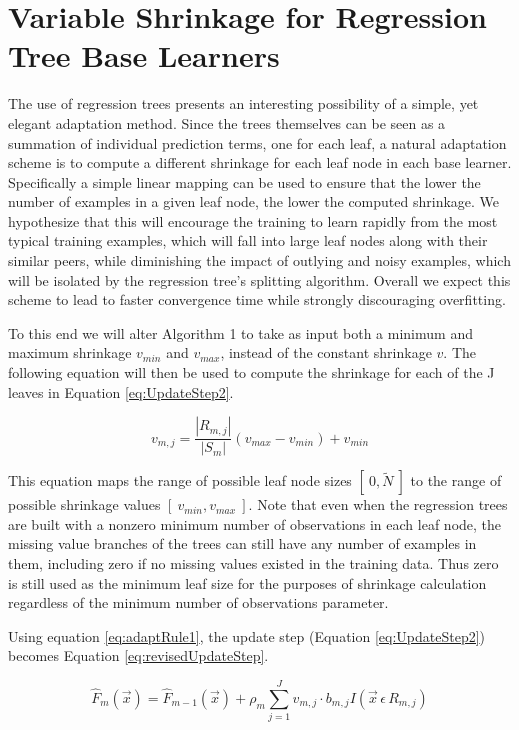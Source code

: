 \documentclass[9pt, conference]{IEEEtran}
\begin{document}
\section{Variable Shrinkage for Regression Tree Base Learners}
\label{sec:VariableLR}
The use of regression trees presents an interesting possibility of a simple, yet elegant adaptation method. Since the trees themselves can be seen as a summation of individual prediction terms, one for each leaf, a natural adaptation scheme is to compute a different shrinkage for each leaf node in each base learner. Specifically a simple linear mapping can be used to ensure that the lower the number of examples in a given leaf node, the lower the computed shrinkage. We hypothesize that this will encourage the training to learn rapidly from the most typical training examples, which will fall into large leaf nodes along with their similar peers, while diminishing the impact of outlying and noisy examples, which will be isolated by the regression tree's splitting algorithm. Overall we expect this scheme to lead to faster convergence time while strongly discouraging overfitting.

To this end we will alter Algorithm 1 to take as input both a minimum and maximum shrinkage \(v_{min}\) and \(v_{max}\), instead of the constant shrinkage \(v\). The following equation will then be used to compute the shrinkage for each of the J leaves in Equation \ref{eq:UpdateStep2}.
	
\begin{equation}
v_{m,j} = \frac{|R_{m,j}|}{{|S_m|}}(v_{max} - v_{min})  + v_{min}
	\label{eq:adaptRule1}
\end{equation}

This equation maps the range of possible leaf node sizes \([\ 0, \tilde{N}\ ]\) to the range of possible shrinkage values \([\ v_{min}, v_{max}\ ]\). Note that even when the regression trees are built with a nonzero minimum number of observations in each leaf node, the missing value branches of the trees can still have any number of examples in them, including zero if no missing values existed in the training data. Thus zero is still used as the minimum leaf size for the purposes of shrinkage calculation regardless of the minimum number of observations parameter. 

Using equation \ref{eq:adaptRule1}, the update step (Equation \ref{eq:UpdateStep2}) becomes Equation \ref{eq:revisedUpdateStep}.

\begin{equation}
	\hat{F}_m(\vec{x}) = \hat{F}_{m-1}(\vec{x}) + \rho_m\sum_{j=1}^{J}v_{m,j}  \cdot  b_{m,j}I(\vec{x} \, \epsilon \, R_{m,j})
	\label{eq:revisedUpdateStep}
\end{equation}
	
\end{document}
